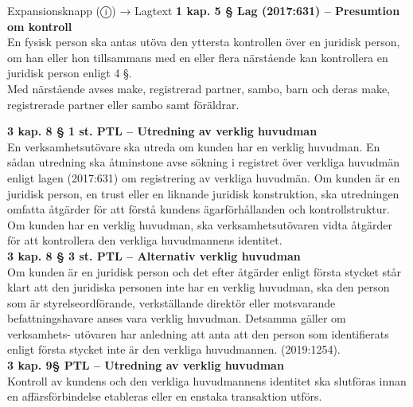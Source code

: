 \documentclass[10pt]{beamer}
\begin{document}
\begin{frame}[label=riskfragor-steg1]
\begin{alertblock}{Expansionsknapp (ⓘ) → Lagtext}
    \tiny \textbf{ 1 kap. 5 § Lag (2017:631) – Presumtion om kontroll}\\
    \tiny  En fysisk person ska antas utöva den yttersta kontrollen över en juridisk person,
     om han eller hon tillsammans med en eller flera närstående kan kontrollera en juridisk person 
     enligt 4 §.\\

    \tiny Med närstående avses make, registrerad partner, sambo, barn och deras make, registrerade
     partner eller sambo samt föräldrar.\\
    \vspace{0.1cm}

    \tiny \textbf{3 kap. 8 § 1 st. PTL – Utredning av verklig huvudman}\\
    \tiny En verksamhetsutövare ska utreda om kunden har en verklig huvudman.
     En sådan utredning ska åtminstone avse sökning i registret över verkliga huvudmän 
     enligt lagen (2017:631) om registrering av verkliga huvudmän. Om kunden är en 
     juridisk person, en trust eller en liknande juridisk konstruktion, ska utredningen 
     omfatta åtgärder för att förstå kundens ägarförhållanden och kontrollstruktur. 
     Om kunden har en verklig huvudman, ska verksamhetsutövaren vidta åtgärder för 
     att kontrollera den verkliga huvudmannens identitet.\\[0.1cm]
    
    \tiny \textbf{3 kap. 8 § 3 st. PTL – Alternativ verklig huvudman}\\
    \tiny Om kunden är en juridisk person och det efter åtgärder enligt första stycket
     står klart att den juridiska personen inte har en verklig huvudman, ska den person 
     som är styrelseordförande, verkställande direktör eller motsvarande befattningshavare 
     anses vara verklig huvudman. Detsamma gäller om verksamhets- utövaren har anledning att 
     anta att den person som identifierats enligt första stycket inte är den verkliga huvudmannen. (2019:1254).\\[0.1cm]

    \tiny \textbf{ 3 kap. 9§ PTL – Utredning av verklig huvudman}\\
    \tiny  Kontroll av kundens och den verkliga huvudmannens identitet ska slutföras
      innan en affärsförbindelse etableras eller en enstaka transaktion utförs.\\


\end{alertblock}
\end{frame}
\end{document}
